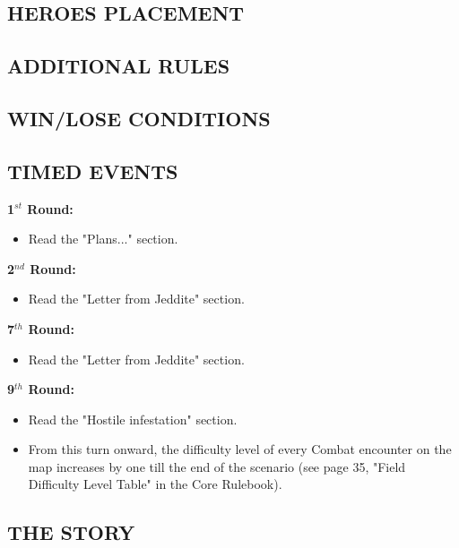 \begin{multicols*}{2}
\subsection*{\MakeUppercase{Heroes placement}}

\subsection*{\MakeUppercase{Additional rules}}

\subsection*{\MakeUppercase{Win/lose conditions}}

\subsection*{\MakeUppercase{Timed events}}

\textbf{1$^{st}$ Round:}
\begin{itemize}
    \item Read the "Plans..." section.
\end{itemize}

\textbf{2$^{nd}$ Round:}
\begin{itemize}
    \item Read the "Letter from Jeddite" section.
\end{itemize}

\textbf{7$^{th}$ Round:}
\begin{itemize}
    \item Read the "Letter from Jeddite" section.
\end{itemize}

\textbf{9$^{th}$ Round:}
\begin{itemize}
    \item Read the "Hostile infestation" section.
    \item From this turn onward, the difficulty level of every Combat encounter on the map increases by one till the end of the scenario (see page 35, "Field Difficulty Level Table" in the Core Rulebook).
\end{itemize}

\newpage

\begin{center}
    \section*{THE STORY}
\end{center}



\end{multicols*}
